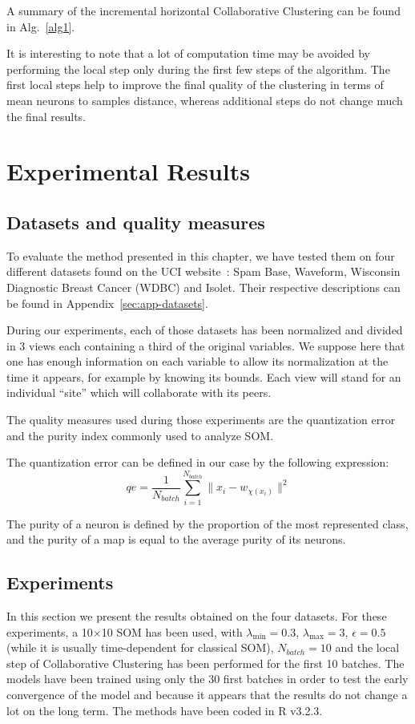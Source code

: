 	A summary of the incremental horizontal Collaborative Clustering can be found in Alg.~\ref{alg1}.
	
	It is interesting to note that a lot of computation time may be avoided by performing the local step only during the first few steps of the algorithm. The first local steps help to improve the final quality of the clustering in terms of mean neurons to samples distance, whereas additional steps do not change much the final results.
	
	\section{Experimental Results}
\label{experiments}
	
	\subsection{Datasets and quality measures}
    To evaluate the method presented in this chapter, we have tested them on four different datasets found on the UCI website~\cite{uci}: Spam Base, Waveform, Wisconsin Diagnostic Breast Cancer (WDBC) and Isolet. Their respective descriptions can be found in Appendix~\ref{sec:app-datasets}.

	During our experiments, each of those datasets has been normalized and divided in 3 views each containing a third of the original variables. We suppose here that one has enough information on each variable to allow its normalization at the time it appears, for example by knowing its bounds. Each view will stand for an individual ``site'' which will collaborate with its peers.
	
	The quality measures used during those experiments are the quantization error and the purity index commonly used to analyze SOM.\@
	
	The quantization error can be defined in our case by the following expression:
	\begin{equation}
\label{eq:som_qe}
	qe = \frac{1}{N_{batch}}\sum_{i=1}^{N_{batch}}\|x_i - w_{\chi(x_i)}\|^2
	\end{equation}
	
	The purity of a neuron is defined by the proportion of the most represented class, and the purity of a map is equal to the average purity of its neurons. 
		
	\subsection{Experiments}
	In this section we present the results obtained on the four datasets. For these experiments, a 10$\times$10 SOM has been used, with $\lambda_{\min}=0.3$, $\lambda_{\max}=3$, $\epsilon=0.5$ (while it is usually time-dependent for classical SOM), $N_{batch}=10$ and the local step of Collaborative Clustering has been performed for the first 10 batches. The models have been trained using only the 30 first batches in order to test the early convergence of the model and because it appears that the results do not change a lot on the long term. The methods have been coded in R v3.2.3.
	
